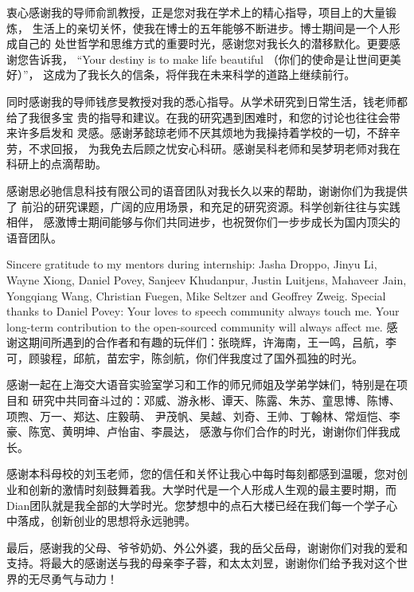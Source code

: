 \begin{thanks}

衷心感谢我的导师俞凯教授，正是您对我在学术上的精心指导，项目上的大量锻炼，
生活上的亲切关怀，使我在博士的五年能够不断进步。博士期间是一个人形成自己的
处世哲学和思维方式的重要时光，感谢您对我长久的潜移默化。更要感谢您告诉我， 
“Your destiny is to make life beautiful （你们的使命是让世间更美好）”， 
这成为了我长久的信条，将伴我在未来科学的道路上继续前行。

同时感谢我的导师钱彦旻教授对我的悉心指导。从学术研究到日常生活，钱老师都给了我很多宝
贵的指导和建议。在我的研究遇到困难时，和您的讨论也往往会带来许多启发和
灵感。感谢茅懿琼老师不厌其烦地为我操持着学校的一切，不辞辛劳，不求回报，
为我免去后顾之忧安心科研。感谢吴科老师和吴梦玥老师对我在科研上的点滴帮助。

感谢思必驰信息科技有限公司的语音团队对我长久以来的帮助，谢谢你们为我提供了
前沿的研究课题，广阔的应用场景，和充足的研究资源。科学创新往往与实践相伴，
感激博士期间能够与你们共同进步，也祝贺你们一步步成长为国内顶尖的语音团队。

Sincere gratitude to my mentors during internship: Jasha Droppo, Jinyu Li, Wayne Xiong, Daniel
Povey, Sanjeev Khudanpur, Justin Luitjens, Mahaveer Jain, Yongqiang Wang, Christian Fuegen, Mike Seltzer and Geoffrey Zweig. Special thanks to Daniel Povey: Your loves to speech community always touch me. Your long-term contribution to the open-sourced community will always affect me. 感谢这期间所遇到的合作者和有趣的玩伴们：张晓辉，许海南，王一鸣，吕航，李可，顾骏程，邱航，苗宏宇，陈剑航，你们伴我度过了国外孤独的时光。

感谢一起在上海交大语音实验室学习和工作的师兄师姐及学弟学妹们，特别是在项目和
研究中共同奋斗过的：邓威、游永彬、谭天、陈露、朱苏、童思博、陈博、项煦、万一、郑达、庄毅萌、
尹茂帆、吴越、刘奇、王帅、丁翰林、常烜恺、李豪、陈宽、黄明坤、卢怡宙、李晨达，
感激与你们合作的时光，谢谢你们伴我成长。


感谢本科母校的刘玉老师，您的信任和关怀让我心中每时每刻都感到温暖，您对创业和创新的激情时刻鼓舞着我。大学时代是一个人形成人生观的最主要时期，而Dian团队就是我全部的大学时光。您梦想中的点石大楼已经在我们每一个学子心中落成，创新创业的思想将永远驰骋。

最后，感谢我的父母、爷爷奶奶、外公外婆，我的岳父岳母，谢谢你们对我的爱和支持。将最大的感谢送与我的母亲李子蓉，和太太刘昱，谢谢你们给予我对这个世界的无尽勇气与动力！

\end{thanks}
